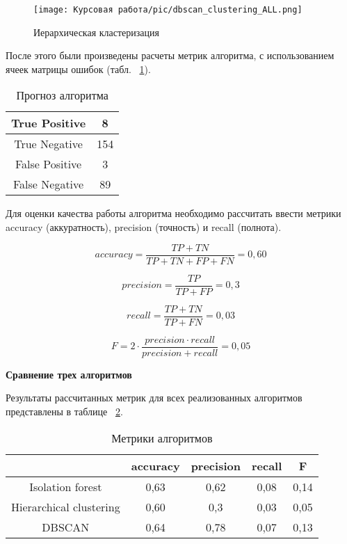 \begin{figure}[H]
    \texttt{[image: Курсовая работа/pic/dbscan\_clustering\_ALL.png]}
    \caption{Иерархическая кластеризация}
    \label{ris:dbscan}
\end{figure}

После этого были произведены расчеты метрик алгоритма, с использованием ячеек матрицы ошибок (табл. ~\ref{tabular:tableDBSCAN}). 

\begin{table}[!ht]
    \onehalfspacing \caption{Прогноз алгоритма}
    \medskip
        \begin{tabular}{|c|c|}
        \hline
            True Positive & 8\\  \hline 
            True Negative & 154\\  \hline 
            False Positive & 3\\  \hline 
            False Negative & 89\\  \hline 
        \end{tabular}
    \label{tabular:tableDBSCAN}
\end{table}

Для оценки качества работы алгоритма необходимо рассчитать ввести метрики accuracy (аккуратность), precision (точность) и recall (полнота).

$$
accuracy = \frac{TP+TN}{TP+TN+FP+FN} = 0,60
$$

$$
precision = \frac{TP}{TP+FP} =  0,3
$$

$$
recall = \frac{TP+TN}{TP+FN} = 0,03
$$

$$
F = 2\cdot \frac{precision \cdot recall}{precision+recall} = 0,05
$$


\vspace{1.5em}
\textbf{Сравнение трех алгоритмов}

Результаты рассчитанных метрик для всех реализованных алгоритмов представлены в таблице ~\ref{tabular:tableСomparison}.

\begin{table}[H]
    \onehalfspacing \caption{Метрики алгоритмов}
    \medskip
        \begin{tabular}{|c|c|c|c|c|}
        \hline
            \backslashbox{}{} & accuracy & precision & recall & F \\ \hline
            Isolation forest & 0,63 & 0,62 & 0,08 & 0,14 \\  \hline 
            Hierarchical clustering & 0,60 & 0,3 & 0,03 & 0,05 \\  \hline 
            DBSCAN & 0,64 & 0,78 & 0,07 & 0,13\\  \hline 
        \end{tabular}
    \label{tabular:tableСomparison}
\end{table}
